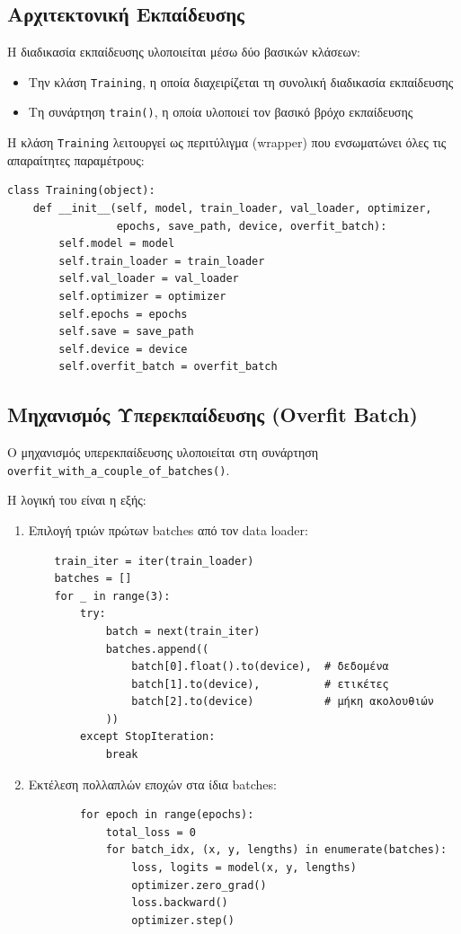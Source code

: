 \documentclass[a4paper,12pt]{article}
\begin{document}
\subsection*{Αρχιτεκτονική Εκπαίδευσης}

Η διαδικασία εκπαίδευσης υλοποιείται μέσω δύο βασικών κλάσεων:

\begin{itemize}
    \item Την κλάση \texttt{Training}, η οποία διαχειρίζεται τη συνολική διαδικασία εκπαίδευσης
    \item Τη συνάρτηση \texttt{train()}, η οποία υλοποιεί τον βασικό βρόχο εκπαίδευσης
\end{itemize}

Η κλάση \texttt{Training} λειτουργεί ως περιτύλιγμα (wrapper) που ενσωματώνει όλες τις απαραίτητες παραμέτρους:

\begin{verbatim}
class Training(object):
    def __init__(self, model, train_loader, val_loader, optimizer, 
                 epochs, save_path, device, overfit_batch):
        self.model = model
        self.train_loader = train_loader
        self.val_loader = val_loader
        self.optimizer = optimizer
        self.epochs = epochs
        self.save = save_path
        self.device = device
        self.overfit_batch = overfit_batch
\end{verbatim}

\subsection*{Μηχανισμός Υπερεκπαίδευσης (Overfit Batch)}

Ο μηχανισμός υπερεκπαίδευσης υλοποιείται στη συνάρτηση
\texttt{overfit\_with\_a\_couple\_of\_batches()}. 

Η λογική του είναι η εξής:

\begin{enumerate}
    \item Επιλογή τριών πρώτων batches από τον data loader:
          \begin{verbatim}
    train_iter = iter(train_loader)
    batches = []
    for _ in range(3):
        try:
            batch = next(train_iter)
            batches.append((
                batch[0].float().to(device),  # δεδομένα
                batch[1].to(device),          # ετικέτες
                batch[2].to(device)           # μήκη ακολουθιών
            ))
        except StopIteration:
            break
    \end{verbatim}

    \item Εκτέλεση πολλαπλών εποχών στα ίδια batches:
    \begin{verbatim}
        for epoch in range(epochs):
            total_loss = 0
            for batch_idx, (x, y, lengths) in enumerate(batches):
                loss, logits = model(x, y, lengths) 
                optimizer.zero_grad()
                loss.backward()
                optimizer.step()
    \end{verbatim}
\end{enumerate}
\end{document}
